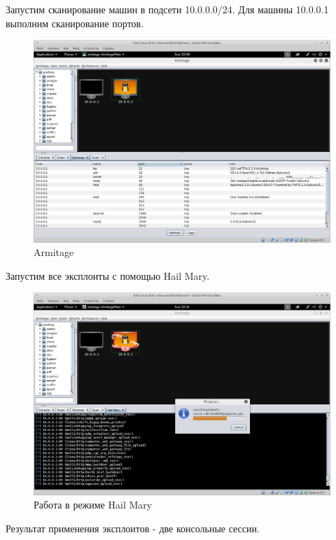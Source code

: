 Запустим сканирование машин в подсети 10.0.0.0/24. Для машины 10.0.0.1 выполним сканирование портов.

\begin{figure}[H]
	\centering
	\includegraphics[width=\textwidth]{figures/2.png}
	\caption{Armitage}
\end{figure}

Запустим все эксплоиты с помощью Hail Mary.

\begin{figure}[H]
	\centering
	\includegraphics[width=\textwidth]{figures/3.png}
	\caption{Работа в режиме Hail Mary}
\end{figure}

Результат применения эксплоитов - две консольные сессии.

